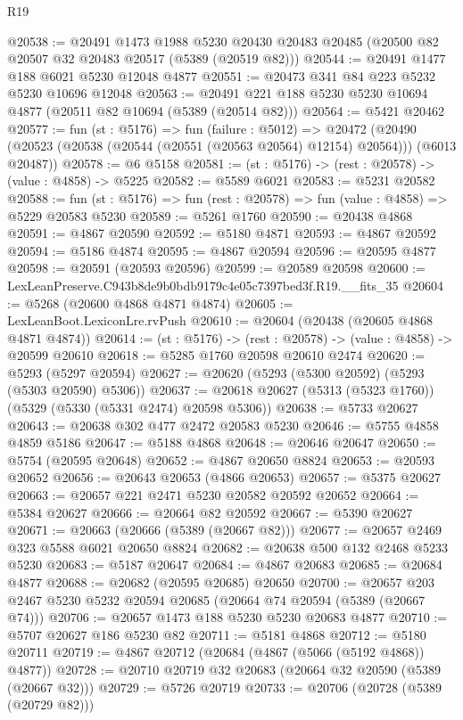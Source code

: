 \begin{lexlean}{R19}
\begin{coremodule}
@20538 := @20491
    @1473
    @1988
    @5230
    @20430
    @20483
    @20485
    (@20500 @82 @20507 @32 @20483 @20517 (@5389 (@20519 @82)))
@20544 := @20491 @1477 @188 @6021 @5230 @12048 @4877
@20551 := @20473 @341 @84 @223 @5232 @5230 @10696 @12048
@20563 := @20491 @221 @188 @5230 @5230 @10694 @4877 (@20511 @82 @10694 (@5389 (@20514 @82)))
@20564 := @5421 @20462
@20577 := fun (st : @5176) =>
  fun (failure : @5012) =>
  @20472 (@20490 (@20523 (@20538 (@20544 (@20551 (@20563 @20564) @12154) @20564))) (@6013 @20487))
@20578 := @6 @5158
@20581 := (st : @5176) -> (rest : @20578) -> (value : @4858) -> @5225
@20582 := @5589 @6021
@20583 := @5231 @20582
@20588 := fun (st : @5176) => fun (rest : @20578) => fun (value : @4858) => @5229 @20583 @5230
@20589 := @5261 @1760
@20590 := @20438 @4868
@20591 := @4867 @20590
@20592 := @5180 @4871
@20593 := @4867 @20592
@20594 := @5186 @4874
@20595 := @4867 @20594
@20596 := @20595 @4877
@20598 := @20591 (@20593 @20596)
@20599 := @20589 @20598
@20600 := LexLeanPreserve.C943b8de9b0bdb9179c4e05c7397bed3f.R19.__fits_35
@20604 := @5268 (@20600 @4868 @4871 @4874)
@20605 := LexLeanBoot.LexiconLre.rvPush
@20610 := @20604 (@20438 (@20605 @4868 @4871 @4874))
@20614 := (st : @5176) -> (rest : @20578) -> (value : @4858) -> @20599 @20610
@20618 := @5285 @1760 @20598 @20610 @2474
@20620 := @5293 (@5297 @20594)
@20627 := @20620 (@5293 (@5300 @20592) (@5293 (@5303 @20590) @5306))
@20637 := @20618 @20627 (@5313 (@5323 @1760)) (@5329 (@5330 (@5331 @2474) @20598 @5306))
@20638 := @5733 @20627
@20643 := @20638 @302 @477 @2472 @20583 @5230
@20646 := @5755 @4858 @4859 @5186
@20647 := @5188 @4868
@20648 := @20646 @20647
@20650 := @5754 (@20595 @20648)
@20652 := @4867 @20650 @8824
@20653 := @20593 @20652
@20656 := @20643 @20653 (@4866 @20653)
@20657 := @5375 @20627
@20663 := @20657 @221 @2471 @5230 @20582 @20592 @20652
@20664 := @5384 @20627
@20666 := @20664 @82 @20592
@20667 := @5390 @20627
@20671 := @20663 (@20666 (@5389 (@20667 @82)))
@20677 := @20657 @2469 @323 @5588 @6021 @20650 @8824
@20682 := @20638 @500 @132 @2468 @5233 @5230
@20683 := @5187 @20647
@20684 := @4867 @20683
@20685 := @20684 @4877
@20688 := @20682 (@20595 @20685) @20650
@20700 := @20657 @203 @2467 @5230 @5232 @20594 @20685 (@20664 @74 @20594 (@5389 (@20667 @74)))
@20706 := @20657 @1473 @188 @5230 @5230 @20683 @4877
@20710 := @5707 @20627 @186 @5230 @82
@20711 := @5181 @4868
@20712 := @5180 @20711
@20719 := @4867 @20712 (@20684 (@4867 (@5066 (@5192 @4868)) @4877))
@20728 := @20710 @20719 @32 @20683 (@20664 @32 @20590 (@5389 (@20667 @32)))
@20729 := @5726 @20719
@20733 := @20706 (@20728 (@5389 (@20729 @82)))

\end{coremodule}
\end{lexlean}
